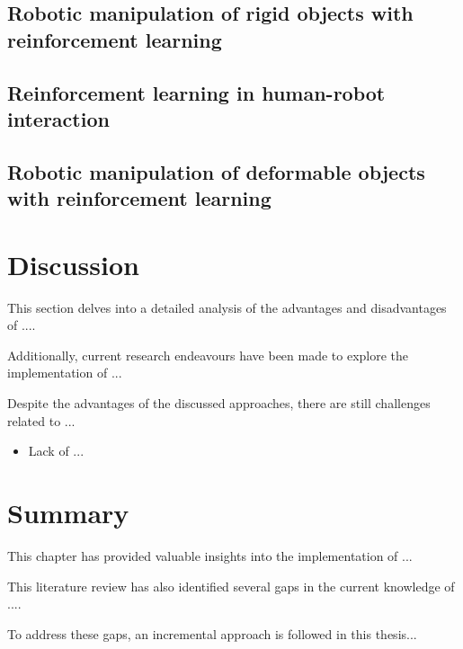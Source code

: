 \subsection{Robotic manipulation of rigid objects with reinforcement learning}
\label{chap2:rl_robotics_rigid}



\subsection{Reinforcement learning in human-robot interaction}
\label{chap2:rl_robotics_hri}


\subsection{Robotic manipulation of deformable objects with reinforcement learning}
\label{chap2:rl_robotics_deformable}

\section{Discussion}
\label{chap2:discussion}

This section delves into a detailed analysis of the advantages and disadvantages of ....

Additionally, current research endeavours have been made to explore the implementation of ...

Despite the advantages of the discussed approaches, there are still challenges related to ...

\begin{itemize}
    \item Lack of ...  
\end{itemize}


\section{Summary}
\label{chap2:summary}

This chapter has provided valuable insights into the implementation of ...

This literature review has also identified several gaps in the current knowledge of ....

To address these gaps, an incremental approach is followed in this thesis...
